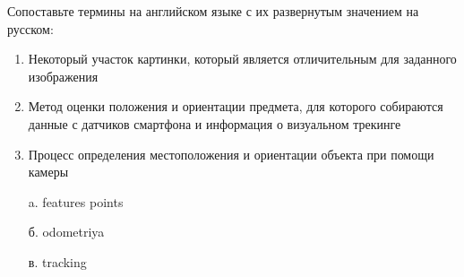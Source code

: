 
Сопоставьте термины на английском языке с их развернутым значением на русском:

        \begin{enumerate}
            \item Некоторый участок картинки, который является отличительным для заданного изображения
            \item Метод оценки положения и ориентации предмета, для которого собираются данные с датчиков смартфона и информация о визуальном трекинге
            \item Процесс определения местоположения и ориентации объекта при помощи камеры
        \end{enumerate}

        \begin{enumerate}
            \item[a.] features points
            \item[б.] odometriya
            \item[в.] tracking
        \end{enumerate}